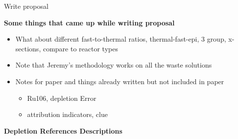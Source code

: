 \documentclass[idxtotoc,hyperref,openany,oneside]{labbook} %
\newcommand{\cmark}{\ding{51}}%
\newcommand{\done}{\rlap{$\square$}{\raisebox{2pt}{\large\hspace{1pt}\cmark}}%
  \hspace{-2.5pt}}
\begin{document}
\begin{todolist}
\item[\done]{Write proposal}
\end{todolist}
\textbf{Some things that came up while writing proposal}
\begin{itemize}
\item{What about different fast-to-thermal ratios, thermal-fast-epi,
  3 group, x-sections, compare to reactor types}
\item{Note that Jeremy's methodology works on all the waste solutions}
\item{Notes for paper and things already written but not included in paper}
  \begin{itemize}
  \item{Ru106, depletion Error}
  \item{attribution indicators, clue}
  \end{itemize}
\end{itemize}
\textbf{Depletion References Descriptions}
\end{document}
